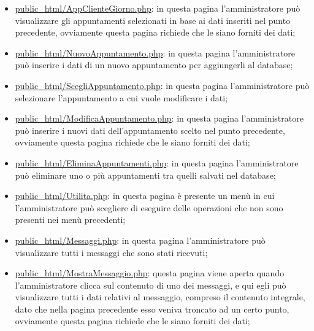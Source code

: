 {\begin{itemize}
		\item \href{http://tecnologie-web.studenti.math.unipd.it/tecweb/~pgabelli/public\_html/AppClienteGiorno.php}{public\_html/AppClienteGiorno.php}: in questa pagina l'amministratore può visualizzare gli appuntamenti selezionati in base ai dati inseriti nel punto precedente, ovviamente questa pagina richiede che le siano forniti dei dati;
		\item \href{http://tecnologie-web.studenti.math.unipd.it/tecweb/~pgabelli/public\_html/NuovoAppuntamento.php}{public\_html/NuovoAppuntamento.php}: in questa pagina l'amministratore può inserire i dati di un nuovo appuntamento per aggiungerli al database;
		\item \href{http://tecnologie-web.studenti.math.unipd.it/tecweb/~pgabelli/public\_html/ScegliAppuntamento.php}{public\_html/ScegliAppuntamento.php}: in questa pagina l'amministratore può selezionare l'appuntamento a cui vuole modificare i dati;
		\item \href{http://tecnologie-web.studenti.math.unipd.it/tecweb/~pgabelli/public\_html/ModificaAppuntamento.php}{public\_html/ModificaAppuntamento.php}: in questa pagina l'amministratore può inserire i nuovi dati dell'appuntamento scelto nel punto precedente, ovviamente questa pagina richiede che le siano forniti dei dati;
		\item \href{http://tecnologie-web.studenti.math.unipd.it/tecweb/~pgabelli/public\_html/EliminaAppuntamenti.php}{public\_html/EliminaAppuntamenti.php}: in questa pagina l'amministratore può eliminare uno o più appuntamenti tra quelli salvati nel database;
		\item \href{http://tecnologie-web.studenti.math.unipd.it/tecweb/~pgabelli/public\_html/Utilita.php}{public\_html/Utilita.php}: in questa pagina è presente un menù in cui l'amministratore può scegliere di eseguire delle operazioni che non sono presenti nei menù precedenti;
		\item \href{http://tecnologie-web.studenti.math.unipd.it/tecweb/~pgabelli/public\_html/Messaggi.php}{public\_html/Messaggi.php}: in questa pagina l'amministratore può visualizzare tutti i messaggi che sono stati ricevuti;
		\item \href{http://tecnologie-web.studenti.math.unipd.it/tecweb/~pgabelli/public\_html/MostraMessaggio.php}{public\_html/MostraMessaggio.php}: questa pagina viene aperta quando l'amministratore clicca sul contenuto di uno dei messaggi, e qui egli può visualizzare tutti i dati relativi al messaggio, compreso il contenuto integrale, dato che nella pagina precedente esso veniva troncato ad un certo punto, ovviamente questa pagina richiede che le siano forniti dei dati;

\end{itemize}}
